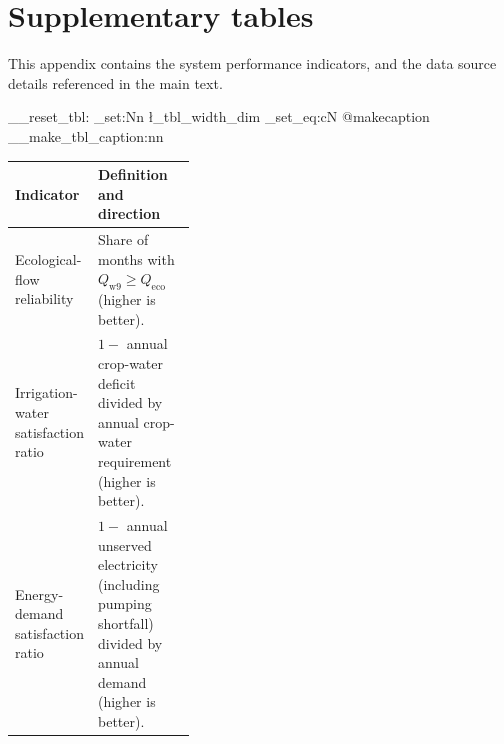\documentclass [a4paper,fleqn] {cas-dc}
\begin{document}
\noindent\begin{minipage}{\columnwidth}
\section{Supplementary tables}
\label{app:supplementary-tables}

This appendix contains the system performance indicators, and the data source details referenced in the main text.
\par\smallskip
\makeatletter{}\makeatother
\ExplSyntaxOn
\__reset_tbl:
\dim_set:Nn \l_tbl_width_dim { \linewidth }
\cs_set_eq:cN { @makecaption } \__make_tbl_caption:nn
\ExplSyntaxOff
\caption{System performance indicators}
\label{tab:system-performance-indicators}
\centering
\sffamily
\footnotesize
\setlength{\tabcolsep}{3pt}
\renewcommand{\arraystretch}{1.10}
\begin{tabularx}{\linewidth}{@{}>{\raggedright\arraybackslash}p{0.36\linewidth}
  >{\raggedright\arraybackslash}X@{}}
\toprule
Indicator & Definition and direction \\
\midrule
Ecological-flow reliability & Share of months with
$Q_{\mathrm{w9}}\geq Q_{\mathrm{eco}}$ (higher is better). \\
Irrigation-water satisfaction ratio & $1-$ annual crop-water deficit divided by
annual crop-water requirement (higher is better). \\
Energy-demand satisfaction ratio & $1-$ annual unserved electricity (including
pumping shortfall) divided by annual demand (higher is better). \\
\bottomrule
\end{tabularx}
\end{minipage}
\par
\onecolumn
\end{document}
